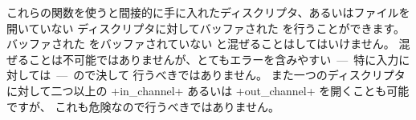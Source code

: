%
これらの関数を使うと間接的に手に入れたディスクリプタ、あるいはファイルを開いていない
ディスクリプタに対してバッファされた \io を行うことができます。
バッファされた \io をバッファされていない \io と混ぜることはしてはいけません。
混ぜることは不可能ではありませんが、とてもエラーを含みやすい~---~特に入力に対しては~---~ので決して
行うべきではありません。
また一つのディスクリプタに対して二つ以上の \ml+in_channel+ あるいは \ml+out_channel+ を開くことも可能ですが、
これも危険なので行うべきではありません。


